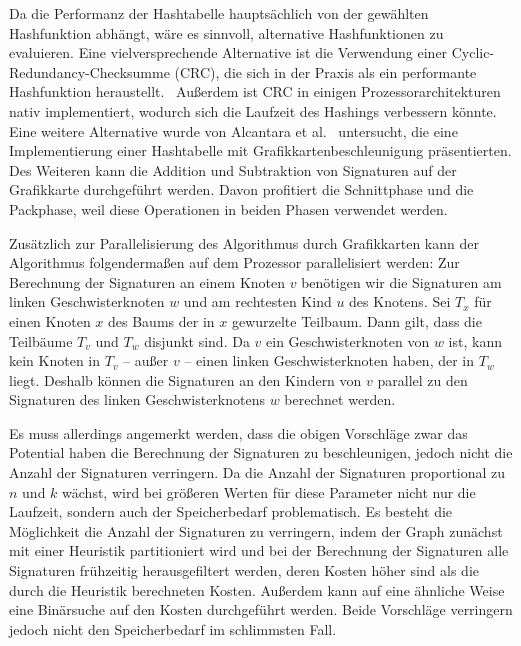 Da die Performanz der Hashtabelle hauptsächlich von der gewählten Hashfunktion abhängt, wäre es sinnvoll, alternative Hashfunktionen zu evaluieren.
Eine vielversprechende Alternative ist die Verwendung einer Cyclic\hyp Redundancy\hyp Checksumme (CRC), die sich in der Praxis als ein performante Hashfunktion heraustellt.~\cite{MPL09, Hua+11}
Außerdem ist CRC in einigen Prozessorarchitekturen~\cite{SSE} nativ implementiert, wodurch sich die Laufzeit des Hashings verbessern könnte.
Eine weitere Alternative wurde von Alcantara et al.~\cite{Alc+09} untersucht, die eine Implementierung einer Hashtabelle mit Grafikkartenbeschleunigung präsentierten.
Des Weiteren kann die Addition und Subtraktion von Signaturen auf der Grafikkarte durchgeführt werden.
Davon profitiert die Schnittphase und die Packphase, weil diese Operationen in beiden Phasen verwendet werden.

Zusätzlich zur Parallelisierung des Algorithmus durch Grafikkarten kann der Algorithmus folgendermaßen auf dem Prozessor parallelisiert werden:
Zur Berechnung der Signaturen an einem Knoten $v$ benötigen wir die Signaturen am linken Geschwisterknoten $w$ und am rechtesten Kind $u$ des Knotens.
Sei $T_x$ für einen Knoten $x$ des Baums der in $x$ gewurzelte Teilbaum.
Dann gilt, dass die Teilbäume $T_v$ und $T_w$ disjunkt sind.
Da $v$ ein Geschwisterknoten von $w$ ist, kann kein Knoten in $T_v$ -- außer $v$ -- einen linken Geschwisterknoten haben, der in $T_w$ liegt.
Deshalb können die Signaturen an den Kindern von $v$ parallel zu den Signaturen des linken Geschwisterknotens $w$ berechnet werden.

Es muss allerdings angemerkt werden, dass die obigen Vorschläge zwar das Potential haben die Berechnung der Signaturen zu beschleunigen, jedoch nicht die Anzahl der Signaturen verringern.
Da die Anzahl der Signaturen proportional zu $n$ und $k$ wächst, wird bei größeren Werten für diese Parameter nicht nur die Laufzeit, sondern auch der Speicherbedarf problematisch.
Es besteht die Möglichkeit die Anzahl der Signaturen zu verringern, indem der Graph zunächst mit einer Heuristik partitioniert wird und bei der Berechnung der Signaturen alle Signaturen frühzeitig herausgefiltert werden, deren Kosten höher sind als die durch die Heuristik berechneten Kosten.
Außerdem kann auf eine ähnliche Weise eine Binärsuche auf den Kosten durchgeführt werden.
Beide Vorschläge verringern jedoch nicht den Speicherbedarf im schlimmsten Fall.
